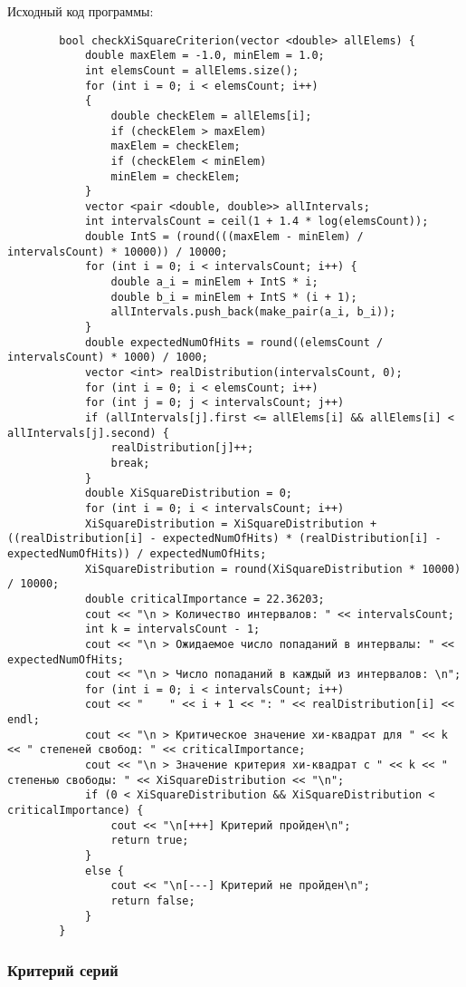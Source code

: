 \documentclass[bachelor, och, coursework]{shiza}
\begin{document}
	Исходный код программы: \
	

	\begin{verbatim}
		bool checkXiSquareCriterion(vector <double> allElems) {
			double maxElem = -1.0, minElem = 1.0;
			int elemsCount = allElems.size();
			for (int i = 0; i < elemsCount; i++)
			{
				double checkElem = allElems[i];
				if (checkElem > maxElem)
				maxElem = checkElem;
				if (checkElem < minElem)
				minElem = checkElem;
			}
			vector <pair <double, double>> allIntervals;
			int intervalsCount = ceil(1 + 1.4 * log(elemsCount));
			double IntS = (round(((maxElem - minElem) / intervalsCount) * 10000)) / 10000;
			for (int i = 0; i < intervalsCount; i++) {
				double a_i = minElem + IntS * i;
				double b_i = minElem + IntS * (i + 1);
				allIntervals.push_back(make_pair(a_i, b_i));
			}
			double expectedNumOfHits = round((elemsCount / intervalsCount) * 1000) / 1000;
			vector <int> realDistribution(intervalsCount, 0);
			for (int i = 0; i < elemsCount; i++)
			for (int j = 0; j < intervalsCount; j++)
			if (allIntervals[j].first <= allElems[i] && allElems[i] < allIntervals[j].second) {
				realDistribution[j]++;
				break;
			}
			double XiSquareDistribution = 0;
			for (int i = 0; i < intervalsCount; i++)
			XiSquareDistribution = XiSquareDistribution + ((realDistribution[i] - expectedNumOfHits) * (realDistribution[i] - expectedNumOfHits)) / expectedNumOfHits;
			XiSquareDistribution = round(XiSquareDistribution * 10000) / 10000;
			double criticalImportance = 22.36203;
			cout << "\n > Количество интервалов: " << intervalsCount;
			int k = intervalsCount - 1;
			cout << "\n > Ожидаемое число попаданий в интервалы: " << expectedNumOfHits;
			cout << "\n > Число попаданий в каждый из интервалов: \n";
			for (int i = 0; i < intervalsCount; i++)
			cout << "    " << i + 1 << ": " << realDistribution[i] << endl;
			cout << "\n > Критическое значение хи-квадрат для " << k << " степеней свобод: " << criticalImportance;
			cout << "\n > Значение критерия хи-квадрат с " << k << " степенью свободы: " << XiSquareDistribution << "\n";
			if (0 < XiSquareDistribution && XiSquareDistribution < criticalImportance) {
				cout << "\n[+++] Критерий пройден\n";
				return true;
			}
			else {
				cout << "\n[---] Критерий не пройден\n";
				return false;
			}
		}
	\end{verbatim}	
	
	\subsubsection{Критерий серий}	
	
\end{document}
